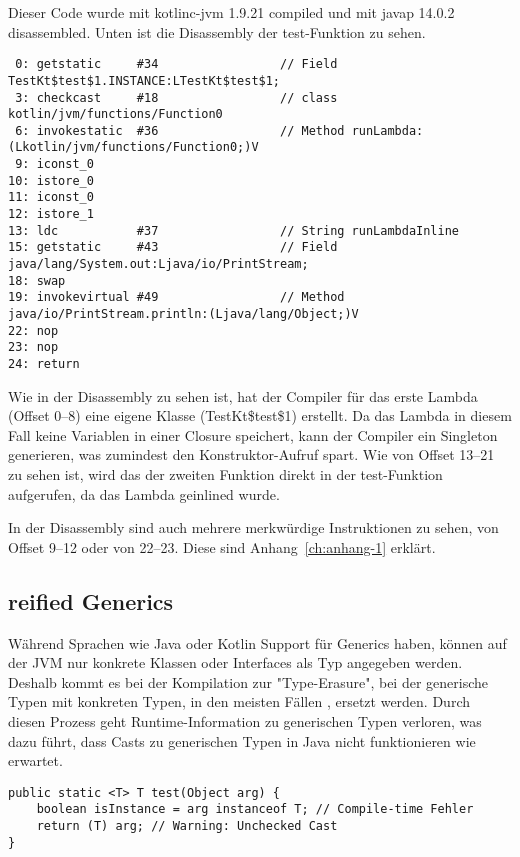 Dieser Code wurde mit kotlinc-jvm 1.9.21 compiled und mit javap 14.0.2 disassembled.
Unten ist die Disassembly der test-Funktion zu sehen.

\begin{verbatim}
 0: getstatic     #34                 // Field TestKt$test$1.INSTANCE:LTestKt$test$1;
 3: checkcast     #18                 // class kotlin/jvm/functions/Function0
 6: invokestatic  #36                 // Method runLambda:(Lkotlin/jvm/functions/Function0;)V
 9: iconst_0
10: istore_0
11: iconst_0
12: istore_1
13: ldc           #37                 // String runLambdaInline
15: getstatic     #43                 // Field java/lang/System.out:Ljava/io/PrintStream;
18: swap
19: invokevirtual #49                 // Method java/io/PrintStream.println:(Ljava/lang/Object;)V
22: nop
23: nop
24: return
\end{verbatim}

Wie in der Disassembly zu sehen ist, hat der Compiler für das erste Lambda (Offset 0--8) eine eigene Klasse
(TestKt\$test\$1) erstellt.
Da das Lambda in diesem Fall keine Variablen in einer Closure speichert, kann der Compiler ein Singleton generieren,
was zumindest den Konstruktor-Aufruf spart.
Wie von Offset 13--21 zu sehen ist, wird das  der zweiten Funktion direkt in der test-Funktion
aufgerufen, da das Lambda geinlined wurde.

\begin{infoBox}
In der Disassembly sind auch mehrere merkwürdige Instruktionen zu sehen, \zB von Offset 9--12 oder von 22--23.
Diese sind Anhang~\ref{ch:anhang-1} erklärt.
\end{infoBox}

\subsection{reified Generics}

Während Sprachen wie Java oder Kotlin Support für Generics haben, können auf der JVM nur konkrete Klassen oder
Interfaces als Typ angegeben werden.
Deshalb kommt es bei der Kompilation zur "Type-Erasure", bei der generische Typen mit konkreten Typen, in den meisten
Fällen , ersetzt werden.
Durch diesen Prozess geht Runtime-Information zu generischen Typen verloren, was \zB dazu führt, dass Casts zu
generischen Typen in Java nicht funktionieren wie erwartet.\cite{jdocTypeErasure}

\begin{verbatim}
public static <T> T test(Object arg) {
    boolean isInstance = arg instanceof T; // Compile-time Fehler
    return (T) arg; // Warning: Unchecked Cast
}
\end{verbatim}

